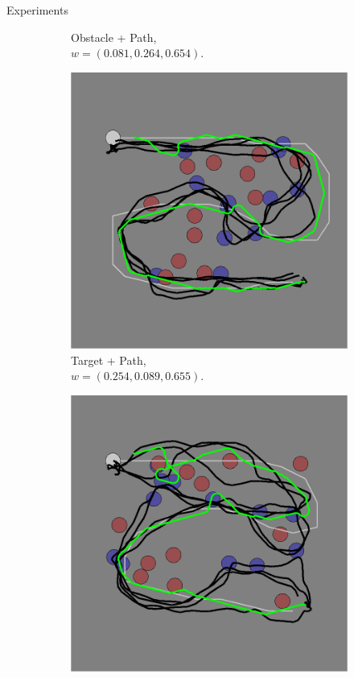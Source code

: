 \documentclass[final]{beamer}
\begin{document}
\begin{frame}{}
\begin{textblock}{69}
\begin{block}{Experiments}
\begin{figure}[h]
\begin{subfigure}[b]{0.47\textwidth}
\caption{Obstacle + Path,\\$w = (0.081, 0.264, 0.654)$. }
\end{subfigure}
\begin{subfigure}[b]{0.47\textwidth}
\includegraphics[width=\textwidth]{task_3.png}
\caption{Target + Path, \\$w = (0.254, 0.089, 0.655)$. }
\end{subfigure}
\begin{subfigure}[b]{0.47\textwidth}
\includegraphics[width=\textwidth]{task_4.png}

\end{subfigure}
\end{figure}
\end{block}
\end{textblock}
\end{frame}
\end{document}
